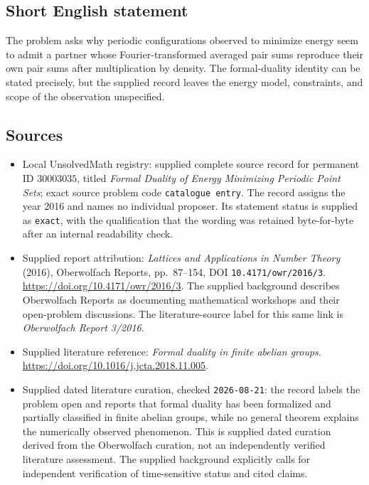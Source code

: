 \documentclass[11pt]{article}
\begin{document}
\subsection{Short English statement}
The problem asks why periodic configurations observed to minimize energy seem to admit a partner whose Fourier-transformed averaged pair sums reproduce their own pair sums after multiplication by density. The formal-duality identity can be stated precisely, but the supplied record leaves the energy model, constraints, and scope of the observation unspecified.
\subsection{Sources}
\begin{itemize}
\item Local UnsolvedMath registry: supplied complete source record for permanent ID \(30003035\), titled \emph{Formal Duality of Energy Minimizing Periodic Point Sets}; exact source problem code \texttt{catalogue entry}. The record assigns the year 2016 and names no individual proposer. Its statement status is supplied as \texttt{exact}, with the qualification that the wording was retained byte-for-byte after an internal readability check.
\item Supplied report attribution: \emph{Lattices and Applications in Number Theory} (2016), Oberwolfach Reports, pp.\ 87--154, DOI \texttt{10.4171/owr/2016/3}. \url{https://doi.org/10.4171/owr/2016/3}. The supplied background describes Oberwolfach Reports as documenting mathematical workshops and their open-problem discussions. The literature-source label for this same link is \emph{Oberwolfach Report 3/2016}.
\item Supplied literature reference: \emph{Formal duality in finite abelian groups}. \url{https://doi.org/10.1016/j.jcta.2018.11.005}.
\item Supplied dated literature curation, checked \texttt{2026-08-21}: the record labels the problem open and reports that formal duality has been formalized and partially classified in finite abelian groups, while no general theorem explains the numerically observed phenomenon. This is supplied dated curation derived from the Oberwolfach curation, not an independently verified literature assessment. The supplied background explicitly calls for independent verification of time-sensitive status and cited claims.
\end{itemize}
\end{document}
